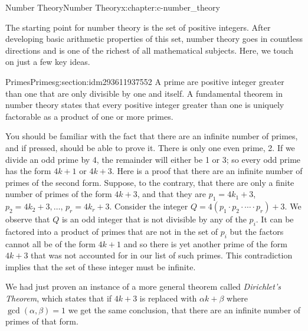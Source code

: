 \documentclass[twoside,10pt,]{book}
\numberwithin{equation}{section}
\begin{document}
\begin{chapterptx}{Number Theory}{}{Number Theory}{}{}{x:chapter:c-number_theory}
\begin{introduction}{}%
The starting point for number theory is the set of positive integers.  After developing basic arithmetic properties of this set, number theory goes in countless directions and is one of the richest of all mathematical subjects. Here, we touch on just a few key ideas.%
\end{introduction}%
%
%
\typeout{************************************************}
\typeout{************************************************}
%
\begin{sectionptx}{Primes}{}{Primes}{}{}{g:section:idm293611937552}
A prime are positive integer greater than one that are only divisible by one and itself. A fundamental theorem in number theory states that every positive integer greater than one is uniquely factorable as a product of one or more primes.%
\par
You should be familiar with the fact that there are an infinite number of primes, and if pressed, should be able to prove it.  There is only one even prime, 2. If we divide an odd prime by 4, the remainder will either be 1 or 3; so every odd prime has the form \(4k+1\) or \(4k+3\).  Here is a proof that there are an infinite number of primes of the second form. Suppose, to the contrary, that there are only a finite number of primes of the form \(4k+3\), and that they are  \(p_1=4k_1+3\), \(p_2=4k_2+3, \dots\), \(p_r=4k_r+3\).  Consider the integer \(Q= 4(p_1 \cdot p_2 \cdot \cdots \cdot p_r)+3\).  We observe that \(Q\) is an odd integer that is not divisible by any of the \(p_i\). It can be factored into a product of primes that are not in the set of \(p_i\) but the factors cannot all be of the form \(4k+1\) and so there is yet another prime of the form \(4k+3\) that was not accounted for in our list of such primes.  This contradiction implies that the set of these integer must be infinite.%
\par
We had just proven an instance of a more general theorem called \emph{Dirichlet's Theorem}, which states that if \(4k+3\) is replaced with \(\alpha k + \beta\) where \(\gcd(\alpha,\beta)=1\) we get the same conclusion, that there are an infinite number of primes of that form.%
\end{sectionptx}
%
%
\typeout{************************************************}
\typeout{************************************************}

\end{chapterptx}
\end{document}
